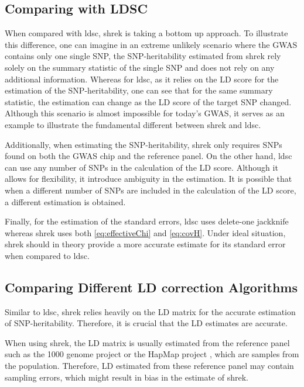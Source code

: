 \documentclass[12pt]{scrbook}
\begin{document}
\subsection{Comparing with LDSC}
When compared with \gls{ldsc}, \gls{shrek} is taking a bottom up approach.
To illustrate this difference, one can imagine in an extreme unlikely scenario where the \gls{GWAS} contains only one single \gls{SNP}, the \gls{SNP}-heritability estimated from \gls{shrek} rely solely on the summary statistic of the single \gls{SNP} and does not rely on any additional information.
Whereas for \gls{ldsc}, as it relies on the \gls{LD} score for the estimation of the \gls{SNP}-heritability, one can see that for the same summary statistic, the estimation can change as the \gls{LD} score of the target \gls{SNP} changed. 
Although this scenario is almost impossible for today's \gls{GWAS}, it serves as an example to illustrate the fundamental different between \gls{shrek} and \gls{ldsc}.

Additionally, when estimating the \gls{SNP}-heritability, \gls{shrek} only requires \glspl{SNP} found on both the \gls{GWAS} chip and the reference panel.
On the other hand, \gls{ldsc} can use any number of \glspl{SNP} in the calculation of the \gls{LD} score. 
Although it allows for flexibility, it introduce ambiguity in the estimation.
It is possible that when a different number of \glspl{SNP} are included in the calculation of the \gls{LD} score, a different estimation is obtained.

Finally, for the estimation of the standard errors, \gls{ldsc} uses delete-one jackknife whereas \gls{shrek} uses both  \cref{eq:effectiveChi} and \cref{eq:covH}. 
Under ideal situation, \gls{shrek} should in theory provide a more accurate estimate for its standard error when compared to \gls{ldsc}.

\subsection{Comparing Different LD correction Algorithms}
\label{sec:ldSim}
Similar to \gls{ldsc}, \gls{shrek} relies heavily on the \gls{LD} matrix for the accurate estimation of \gls{SNP}-heritability.
Therefore, it is crucial that the \gls{LD} estimates are accurate. 

When using \gls{shrek}, the \gls{LD} matrix is usually estimated from the reference panel such as the 1000 genome project \citep{Project2012} or the HapMap project \citep{Altshuler2010}, which are samples from the population.
Therefore, \gls{LD} estimated from these reference panel may contain sampling errors, which might result in bias in the estimate of \gls{shrek}.
\end{document}
